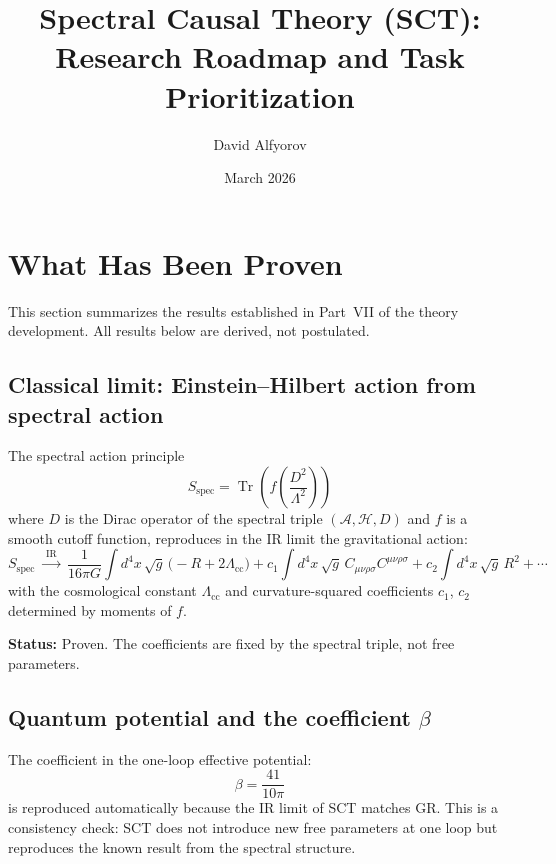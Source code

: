 \documentclass[12pt,a4paper]{article}
\title{\textbf{Spectral Causal Theory (SCT):\\[4pt]
Research Roadmap and Task Prioritization}}
\author{David Alfyorov}
\date{March 2026}
\newcommand{\Tr}{\operatorname{Tr}}
\newcommand{\Lam}{\Lambda}
\begin{document}
\maketitle
\begin{center}
\end{center}
\tableofcontents
\newpage

\section{\textcolor{proven}{What Has Been Proven}}
\label{sec:proven}

This section summarizes the results established in Part~VII of the theory development.
All results below are derived, not postulated.

\subsection{Classical limit: Einstein--Hilbert action from spectral action}

The spectral action principle
\begin{equation}\label{eq:spectral-action}
  S_{\text{spec}} = \Tr\!\left(f\!\left(\frac{D^2}{\Lam^2}\right)\right)
\end{equation}
where $D$ is the Dirac operator of the spectral triple $(\mathcal{A}, \mathcal{H}, D)$
and $f$ is a smooth cutoff function, reproduces in the IR limit the gravitational action:
\begin{equation}\label{eq:EH-limit}
  S_{\text{spec}} \;\xrightarrow{\;\text{IR}\;}\;
  \frac{1}{16\pi G}\int d^4x\,\sqrt{g}\,
  \bigl(-R + 2\Lam_{\text{cc}}\bigr)
  + c_1 \int d^4x\,\sqrt{g}\, C_{\mu\nu\rho\sigma}C^{\mu\nu\rho\sigma}
  + c_2 \int d^4x\,\sqrt{g}\, R^2 + \cdots
\end{equation}
with the cosmological constant $\Lam_{\text{cc}}$ and curvature-squared coefficients
$c_1$, $c_2$ determined by moments of $f$.

\textbf{Status:} Proven. The coefficients are fixed by the spectral triple,
not free parameters.

\subsection{Quantum potential and the coefficient $\beta$}

The coefficient in the one-loop effective potential:
\begin{equation}\label{eq:beta}
  \beta = \frac{41}{10\pi}
\end{equation}
is reproduced automatically because the IR limit of SCT matches GR.
This is a consistency check: SCT does not introduce new free parameters at one loop
but reproduces the known result from the spectral structure.
\end{document}
